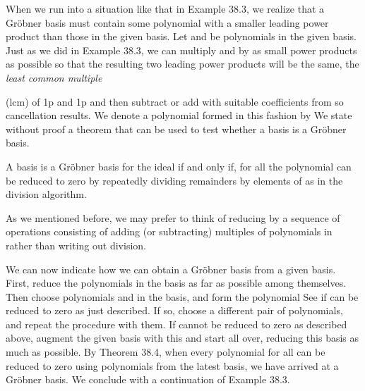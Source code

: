 \documentclass[11pt,oneside]{article}
\begin{document}
\begin{BookBody}
When we run into a situation like that in Example 38.3, we realize that a Gröbner basis must contain some polynomial with a smaller leading power product than those in the given basis. Let  and  be polynomials in the given basis. Just as we did in Example 38.3, we can multiply  and  by as small power products as possible so that the resulting two leading power products will be the same, the\textit{ least common multiple}

\end{BookBody}

\BookNarrativetrue

\begin{BookBody}

\noindent (lcm) of 1p and 1p and then subtract or add with suitable coefficients from  so cancellation results. We denote a polynomial formed in this fashion by  We state without proof a theorem that can be used to test whether a basis is a Gröbner basis.

 A basis  is a Gröbner basis for the ideal  if and only if, for all  the polynomial  can be reduced to zero by repeatedly dividing remainders by elements of  as in the division algorithm.

As we mentioned before, we may prefer to think of reducing  by a sequence of operations consisting of adding (or subtracting) multiples of polynomials in  rather than writing out division.

We can now indicate how we can obtain a Gröbner basis from a given basis. First, reduce the polynomials in the basis as far as possible among themselves. Then choose polynomials  and  in the basis, and form the polynomial  See if  can be reduced to zero as just described. If so, choose a different pair of polynomials, and repeat the procedure with them. If  cannot be reduced to zero as described above, augment the given basis with this  and start all over, reducing this basis as much as possible. By Theorem 38.4, when every polynomial  for all  can be reduced to zero using polynomials from the latest basis, we have arrived at a Gröbner basis. We conclude with a continuation of Example 38.3.


\end{BookBody}
\end{document}
